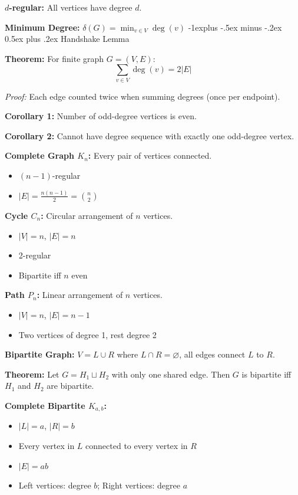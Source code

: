 \documentclass[10pt,landscape]{article}
\makeatletter
\renewcommand{\subsection}{\@startsection{subsection}{2}{0mm}%
                                {-1explus -.5ex minus -.2ex}%
                                {0.5ex plus .2ex}%
                                {\normalfont\normalsize\bfseries}}
\makeatother
\begin{document}
\begin{multicols}{3}
\textbf{$d$-regular:} All vertices have degree $d$.

\textbf{Minimum Degree:} $\delta(G) = \min_{v \in V} \deg(v)$
\subsection{Handshake Lemma}

\textbf{Theorem:} For finite graph $G = (V, E)$:
$$\sum_{v \in V} \deg(v) = 2|E|$$

\textit{Proof:} Each edge counted twice when summing degrees (once per endpoint).

\textbf{Corollary 1:} Number of odd-degree vertices is even.

\textbf{Corollary 2:} Cannot have degree sequence with exactly one odd-degree vertex.

\textbf{Complete Graph $K_n$:} Every pair of vertices connected.
\begin{itemize}
\item $(n-1)$-regular
\item $|E| = \frac{n(n-1)}{2} = \binom{n}{2}$
\end{itemize}

\textbf{Cycle $C_n$:} Circular arrangement of $n$ vertices.
\begin{itemize}
\item $|V| = n$, $|E| = n$
\item 2-regular
\item Bipartite iff $n$ even
\end{itemize}

\textbf{Path $P_n$:} Linear arrangement of $n$ vertices.
\begin{itemize}
\item $|V| = n$, $|E| = n-1$
\item Two vertices of degree 1, rest degree 2
\end{itemize}

\textbf{Bipartite Graph:} $V = L \cup R$ where $L \cap R = \varnothing$, all edges connect $L$ to $R$.

\textbf{Theorem:} Let $G = H_1 \sqcup H_2$ with only one shared edge. Then $G$ is bipartite iff $H_1$ and $H_2$ are bipartite. 

\textbf{Complete Bipartite $K_{a,b}$:}
\begin{itemize}
\item $|L| = a$, $|R| = b$
\item Every vertex in $L$ connected to every vertex in $R$
\item $|E| = ab$
\item Left vertices: degree $b$; Right vertices: degree $a$
\end{itemize}


\end{multicols}
\end{document}
